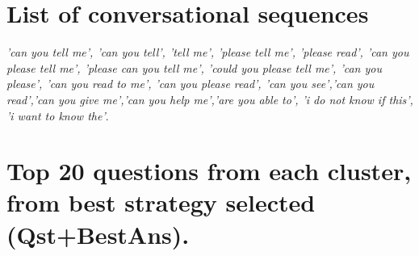 \clearpage
\appendix

\section{List of conversational sequences}
\label{app:conversational_seq}
\emph{'can you tell me', 'can you tell', 'tell me', 'please tell me', 'please read', 'can you please tell me',  'please can you tell me', 'could you please tell me', 'can you please', 'can you read to me',  'can you please read', 'can you see','can you read','can you give me','can you help me','are you able to', 'i do not know if this', 'i want to know the'}. 

\section{Top 20 questions from each cluster, from best strategy selected (Qst+BestAns).}
\label{app:clusters}

